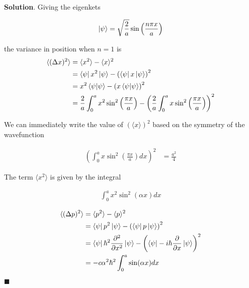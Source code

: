 \documentclass[12pt]{article}
\theoremstyle{definition}
\newenvironment{s}{%
        \begin{trivlist} \item \textbf{Solution}. }{%
            \hspace*{\fill} $\blacksquare$\end{trivlist}}%
\begin{document}
{\begin{s}
Giving the eigenkets 

\begin{align*}
\ket{\psi} = \sqrt{\frac{2}{a}}\sin\left(\frac{n\pi x}{a}\right)
\end{align*}


the variance in position when $n=1$ is
\begin{align*}
\langle (\Delta x)^{2}\rangle &= \langle x^{2} \rangle - \langle x\rangle^{2}\\
&= \bra{\psi} x^{2} \ket{\psi} - \left(\bra{\psi} x \ket{\psi}\right)^{2}\\
&= x^{2}\bra{\psi}\ket{\psi} - \left(x\bra{\psi}\ket{\psi}\right)^{2}\\
&= \frac{2}{a}\int_{0}^{a} x^{2} \sin^{2}\left(\frac{\pi x}{a}\right) - \left(\frac{2}{a}\int_{0}^{a} x \sin^{2}\left(\frac{\pi x}{a}\right)\right)^{2}
\end{align*}

We can immediately write the value of $\left(\langle x \rangle\right)^{2}$ based on the symmetry of the wavefunction

\begin{align*}
\left(\int_{0}^{a} x \sin^{2}\left(\frac{\pi x}{a}\right)dx\right)^{2} &= \frac{a^{2}}{4}
\end{align*}

The term $\langle x^{2} \rangle$ is given by the integral

\begin{align*}
\int_{0}^{a} x^{2} \sin^{2}\left(\alpha x\right)dx 
\end{align*}

\begin{align*}
\langle (\Delta p)^{2}\rangle &= \langle p^{2} \rangle - \langle p\rangle^{2}\\
&= \bra{\psi} p^{2} \ket{\psi} - \left(\bra{\psi} p \ket{\psi}\right)^{2}\\
&= \bra{\psi} \hbar^{2}\frac{\partial^{2}}{\partial x^{2}} \ket{\psi} - \left(\bra{\psi} -i\hbar\frac{\partial}{\partial x} \ket{\psi}\right)^{2}\\
&= -c\alpha^{2}\hbar^{2}\int_{0}^{a} \sin(\alpha x)dx
\end{align*}

\end{s}
\end{document}
